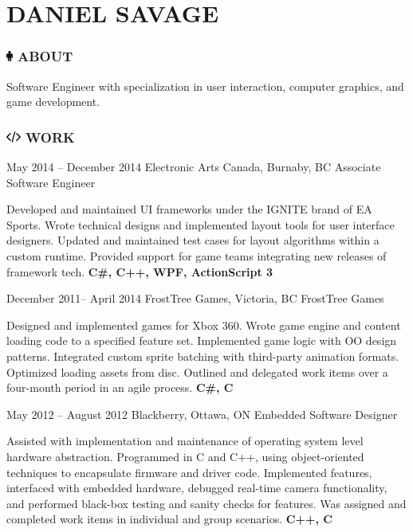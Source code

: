 \documentclass[10pt]{tccv}
\begin{document}
\part{DANIEL SAVAGE}

\flafamily

\section{\textcolor{black}{\includegraphics[height=10pt, keepaspectratio=true]{male}} ABOUT}

Software Engineer with specialization in user interaction, computer graphics, and game development.

\section{\includegraphics[height=10pt, keepaspectratio=true]{code} WORK}

\begin{eventlist}

\item{May 2014 -- December 2014}
     {Electronic Arts Canada, Burnaby, BC}
     {Associate Software Engineer}

Developed and maintained UI frameworks under the IGNITE brand of EA Sports. Wrote technical designs and implemented layout tools for user interface designers. Updated and maintained test cases for layout algorithms within a custom runtime. Provided support for game teams integrating new releases of framework tech. \textbf{C\#, C++, WPF, ActionScript 3}

\item{December 2011-- April 2014}
     {FrostTree Games, Victoria, BC}
     {FrostTree Games}

Designed and implemented games for Xbox 360. Wrote game engine and content loading code to a specified feature set. Implemented game logic with OO design patterns. Integrated custom sprite batching with third-party animation formats. Optimized loading assets from disc. Outlined and delegated work items over a four-month period in an agile process. \textbf{C\#, C}

\item{May 2012 -- August 2012}
     {Blackberry, Ottawa, ON}
     {Embedded Software Designer}

Assisted with implementation and maintenance of operating system level hardware abstraction. Programmed in C and C++, using object-oriented techniques to encapsulate firmware and driver code. Implemented features, interfaced with embedded hardware, debugged real-time camera functionality, and performed black-box testing and sanity checks for features. Was assigned and completed work items in individual and group scenarios. \textbf{C++, C}

\end{eventlist}
\end{document}
